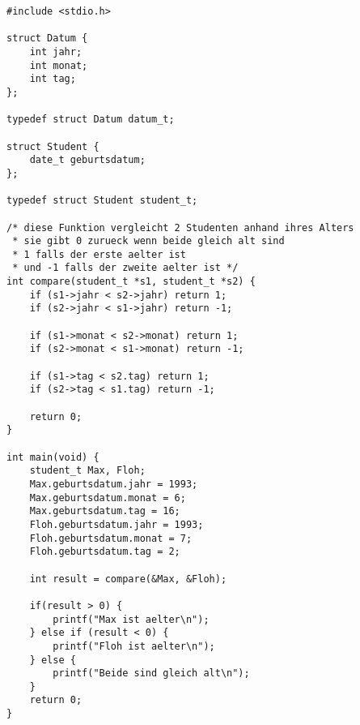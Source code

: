 \documentclass[c_worksheet.tex]{subfiles}
\begin{document}
\begin{lstlisting}
#include <stdio.h>

struct Datum {
    int jahr;
    int monat;
    int tag;
};

typedef struct Datum datum_t;

struct Student {
    date_t geburtsdatum;
};

typedef struct Student student_t;

/* diese Funktion vergleicht 2 Studenten anhand ihres Alters
 * sie gibt 0 zurueck wenn beide gleich alt sind
 * 1 falls der erste aelter ist
 * und -1 falls der zweite aelter ist */
int compare(student_t *s1, student_t *s2) {
    if (s1->jahr < s2->jahr) return 1;
    if (s2->jahr < s1->jahr) return -1;
    
    if (s1->monat < s2->monat) return 1;
    if (s2->monat < s1->monat) return -1;

    if (s1->tag < s2.tag) return 1;
    if (s2->tag < s1.tag) return -1;

    return 0;
}

int main(void) {
    student_t Max, Floh;
    Max.geburtsdatum.jahr = 1993;
    Max.geburtsdatum.monat = 6;
    Max.geburtsdatum.tag = 16;
    Floh.geburtsdatum.jahr = 1993;
    Floh.geburtsdatum.monat = 7;
    Floh.geburtsdatum.tag = 2;

    int result = compare(&Max, &Floh);

    if(result > 0) {
        printf("Max ist aelter\n");
    } else if (result < 0) {
        printf("Floh ist aelter\n");
    } else {
        printf("Beide sind gleich alt\n");
    }
    return 0;
}
\end{lstlisting}
\end{document}
